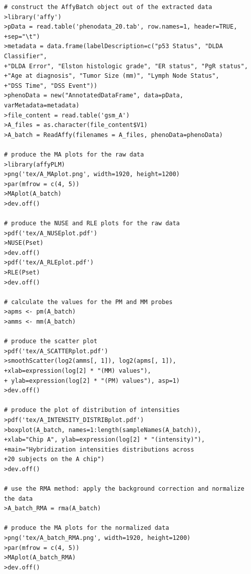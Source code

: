 \documentclass{article}
\begin{document}
\begin{verbatim}
# construct the AffyBatch object out of the extracted data
>library('affy')
>pData = read.table('phenodata_20.tab', row.names=1, header=TRUE,
+sep="\t")
>metadata = data.frame(labelDescription=c("p53 Status", "DLDA Classifier",
+"DLDA Error", "Elston histologic grade", "ER status", "PgR status",
+"Age at diagnosis", "Tumor Size (mm)", "Lymph Node Status",
+"DSS Time", "DSS Event"))
>phenoData = new("AnnotatedDataFrame", data=pData, varMetadata=metadata)
>file_content = read.table('gsm_A')
>A_files = as.character(file_content$V1)
>A_batch = ReadAffy(filenames = A_files, phenoData=phenoData)

# produce the MA plots for the raw data
>library(affyPLM)
>png('tex/A_MAplot.png', width=1920, height=1200)
>par(mfrow = c(4, 5))
>MAplot(A_batch)
>dev.off()

# produce the NUSE and RLE plots for the raw data
>pdf('tex/A_NUSEplot.pdf')
>NUSE(Pset)
>dev.off()
>pdf('tex/A_RLEplot.pdf')
>RLE(Pset)
>dev.off()

# calculate the values for the PM and MM probes
>apms <- pm(A_batch)
>amms <- mm(A_batch)

# produce the scatter plot
>pdf('tex/A_SCATTERplot.pdf')
>smoothScatter(log2(amms[, 1]), log2(apms[, 1]),
+xlab=expression(log[2] * "(MM) values"),
+ ylab=expression(log[2] * "(PM) values"), asp=1)
>dev.off()

# produce the plot of distribution of intensities
>pdf('tex/A_INTENSITY_DISTRIBplot.pdf')
>boxplot(A_batch, names=1:length(sampleNames(A_batch)),
+xlab="Chip A", ylab=expression(log[2] * "(intensity)"),
+main="Hybridization intensities distributions across
+20 subjects on the A chip")
>dev.off()

# use the RMA method: apply the background correction and normalize the data
>A_batch_RMA = rma(A_batch)

# produce the MA plots for the normalized data
>png('tex/A_batch_RMA.png', width=1920, height=1200)
>par(mfrow = c(4, 5))
>MAplot(A_batch_RMA)
>dev.off()
\end{verbatim}

\newpage
\end{document}
